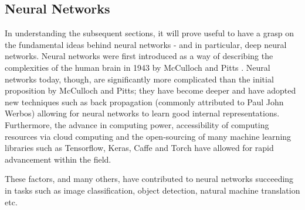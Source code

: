 \subsection{Neural Networks}
In understanding the subsequent sections, it will prove useful to have a grasp on the fundamental ideas behind neural networks - and in particular, deep neural networks. 
Neural networks were first introduced as a way of describing the complexities of the human brain in 1943 by McCulloch and Pitts \autocite{pitts}.
\newline
Neural networks today, though, are significantly more complicated than the initial proposition by McCulloch and Pitts; they have become deeper and have adopted new techniques such as back propagation (commonly attributed to Paul John Werbos) allowing for neural networks to learn good internal representations. 
Furthermore, the advance in computing power, accessibility of computing resources via cloud computing and the open-sourcing of many machine learning libraries such as Tensorflow, Keras, Caffe and Torch have allowed for rapid advancement within the field.

These factors, and many others, have contributed to neural networks succeeding in tasks such as image classification, object detection, natural machine translation etc. 
